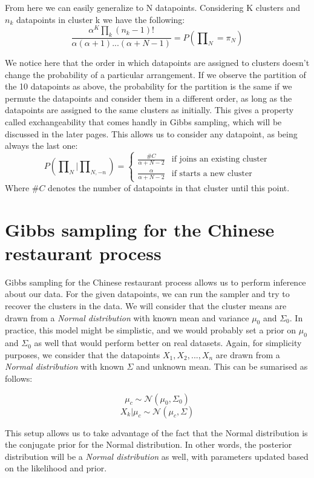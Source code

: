 \documentclass[12pt,a4paper]{article}
\begin{document}
From here we can easily generalize to N datapoints. Considering K clusters and $n_{k}$ datapoints in cluster k we have the following: $$\frac{\alpha^{K} \prod_{k}(n_{k}-1)!}{\alpha(\alpha+1)...(\alpha+N-1)} = P(\prod\nolimits_{N} = \pi_{N})$$

We notice here that the order in which datapoints are assigned to clusters doesn't change the probability of a particular arrangement. If we observe the partition of the 10 datapoints as above, the probability for the partition is the same if we permute the datapoints and consider them in a different order, as long as the datapoints are assigned to the same clusters as initially. This gives a property called exchangeability that comes handly in Gibbs sampling, which will be discussed in the later pages. This allows us to consider any datapoint, as being always the last one: 
$$P(\prod\nolimits_{N}|\prod\nolimits_{N, -n})= \left \{
    \begin{array}{ll}
		\frac{\#C}{\alpha+ N - 2} & \mbox{if joins an existing cluster} \\
		\frac{\alpha}{\alpha+N-2} & \mbox{if starts a new cluster} 
	\end{array}
\right. $$ Where $\#C$ denotes the number of datapoints in that cluster until this point.

\section{Gibbs sampling for the Chinese restaurant process}
Gibbs sampling for the Chinese restaurant process allows us to perform inference about our data. For the given datapoints, we can run the sampler and try to recover the clusters in the data. We will consider that the cluster means are drawn from a \textit{Normal distribution} with known mean and variance $\mu_{0}$ and $\Sigma_{0}$. In practice, this model might be simplistic, and we would probably set a prior on $\mu_{0}$ and $\Sigma_{0}$ as well that would perform better on real datasets. Again, for simplicity purposes, we consider that the datapoints $X_{1}, X_{2}, ..., X_{n}$ are drawn from a \textit{Normal distribution} with known $\Sigma$ and unknown mean. This can be sumarised as follows: 

$$ \mu_{c} \sim \mathcal{N}(\mu_{0}, \Sigma_{0})$$
$$ X_{k}|\mu_{c} \sim \mathcal{N}(\mu_{c}, \Sigma) $$

This setup allows us to take advantage of the fact that the Normal distribution is the conjugate prior for the Normal distribution. In other words, the posterior distribution will be a \textit{Normal distribution} as well, with parameters updated based on the likelihood and prior.
\end{document}
